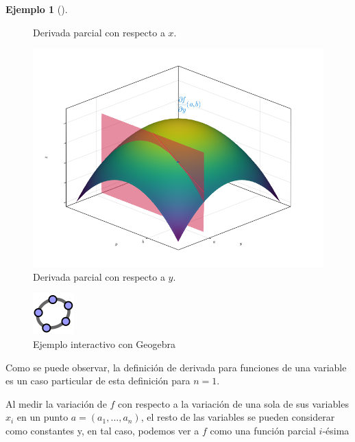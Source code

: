 \documentclass[
  a4paper,
]{scrreport}
\theoremstyle{definition}
\newtheorem{example}{Ejemplo}[chapter]
\theoremstyle{plain}
\theoremstyle{definition}
\theoremstyle{definition}
\theoremstyle{plain}
\theoremstyle{plain}
\theoremstyle{remark}
\begin{document}
\begin{example}[]
\begin{figure}[H]
{}

\caption{Derivada parcial con respecto a \(x\).}

\end{figure}%

\begin{figure}[H]

{\centering \includegraphics{./img/derivadas-funciones-varias-variables/derivada-parcial-y.png}

}

\caption{Derivada parcial con respecto a \(y\).}

\end{figure}%

\begin{figure}[H]

{\centering \includegraphics{img/logos/logo-geogebra.png}

}

\caption{Ejemplo interactivo con Geogebra}

\end{figure}%

Como se puede observar, la definición de derivada para funciones de una
variable es un caso particular de esta definición para \(n=1\).

Al medir la variación de \(f\) con respecto a la variación de una sola
de sus variables \(x_i\) en un punto \(a=(a_1,\ldots,a_n)\), el resto de
las variables se pueden considerar como constantes y, en tal caso,
podemos ver a \(f\) como una función parcial \(i\)-ésima


\end{example}
\end{document}
